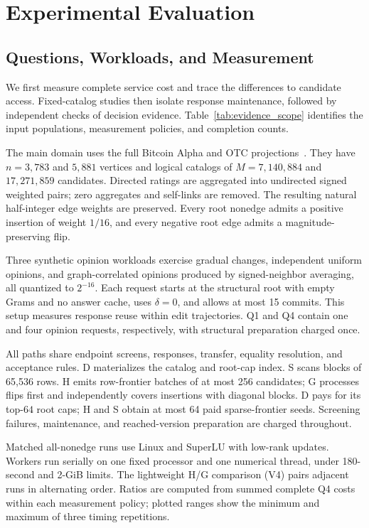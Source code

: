 \section{Experimental Evaluation}
\label{sec:evaluation}

\subsection{Questions, Workloads, and Measurement}
We first measure complete service cost and trace the differences to candidate access. Fixed-catalog studies then isolate response maintenance, followed by independent checks of decision evidence. Table~\ref{tab:evidence_scope} identifies the input populations, measurement policies, and completion counts.

The main domain uses the full Bitcoin Alpha and OTC projections~\cite{snapalpha,snapotc,kumar2016edge}. They have $n=3{,}783$ and $5{,}881$ vertices and logical catalogs of $M=7{,}140{,}884$ and $17{,}271{,}859$ candidates. Directed ratings are aggregated into undirected signed weighted pairs; zero aggregates and self-links are removed. The resulting natural half-integer edge weights are preserved. Every root nonedge admits a positive insertion of weight $1/16$, and every negative root edge admits a magnitude-preserving flip.

Three synthetic opinion workloads exercise gradual changes, independent uniform opinions, and graph-correlated opinions produced by signed-neighbor averaging, all quantized to $2^{-16}$. Each request starts at the structural root with empty Grams and no answer cache, uses $\delta=0$, and allows at most 15 commits. This setup measures response reuse within edit trajectories. Q1 and Q4 contain one and four opinion requests, respectively, with structural preparation charged once.

All paths share endpoint screens, responses, transfer, equality resolution, and acceptance rules. D materializes the catalog and root-cap index. S scans blocks of 65,536 rows. H emits row-frontier batches of at most 256 candidates; G processes flips first and independently covers insertions with diagonal blocks. D pays for its top-$64$ root caps; H and S obtain at most 64 paid sparse-frontier seeds. Screening failures, maintenance, and reached-version preparation are charged throughout.

Matched all-nonedge runs use Linux and SuperLU with low-rank updates. Workers run serially on one fixed processor and one numerical thread, under 180-second and 2-GiB limits. The lightweight H/G comparison (V4) pairs adjacent runs in alternating order. Ratios are computed from summed complete Q4 costs within each measurement policy; plotted ranges show the minimum and maximum of three timing repetitions.

